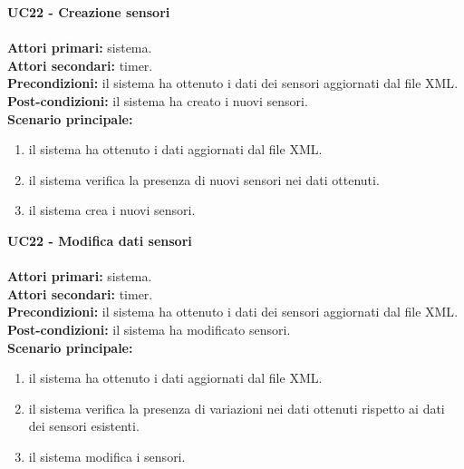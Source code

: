 \leavevmode\newline
\textbf{UC22 - Creazione sensori}
\\\\
\textbf{Attori primari:} sistema.
\\
\textbf{Attori secondari:} timer.
\\
\textbf{Precondizioni:} il sistema ha ottenuto i dati dei sensori aggiornati dal file \gls{XML}.
\\
\textbf{Post-condizioni:} il sistema ha creato i nuovi sensori.
\\
\textbf{Scenario principale:}
\begin{enumerate}
    \item il sistema ha ottenuto i dati aggiornati dal file \gls{XML}.
    \item il sistema verifica la presenza di nuovi sensori nei dati ottenuti.
    \item il sistema crea i nuovi sensori.
\end{enumerate}

\leavevmode\newline
\textbf{UC22 - Modifica dati sensori}
\\\\
\textbf{Attori primari:} sistema.
\\
\textbf{Attori secondari:} timer.
\\
\textbf{Precondizioni:} il sistema ha ottenuto i dati dei sensori aggiornati dal file \gls{XML}.
\\
\textbf{Post-condizioni:} il sistema ha modificato sensori.
\\
\textbf{Scenario principale:}
\begin{enumerate}
    \item il sistema ha ottenuto i dati aggiornati dal file \gls{XML}.
    \item il sistema verifica la presenza di variazioni nei dati ottenuti rispetto ai dati dei sensori esistenti.
    \item il sistema modifica i sensori.
\end{enumerate}

